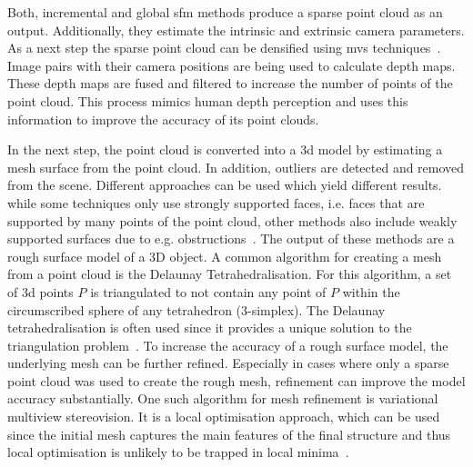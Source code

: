Both, incremental and global \gls{sfm} methods produce a sparse point cloud as an output. Additionally, they estimate the intrinsic and extrinsic camera parameters. As a next step the sparse point cloud can be densified using \gls{mvs} techniques~\cite{Pagani2011DenseImages}. Image pairs with their camera positions are being used to calculate depth maps. These depth maps are fused and filtered to increase the number of points of the point cloud. This process mimics human depth perception and uses this information to improve the accuracy of its point clouds.

In the next step, the point cloud is converted into a \gls{3d} model by estimating a mesh surface from the point cloud. In addition, outliers are detected and removed from the scene. Different approaches can be used which yield different results. while some techniques only use strongly supported faces, i.e. faces that are supported by many points of the point cloud, other methods also include weakly supported surfaces due to e.g. obstructions~\cite{Jancosek2014ExploitingSurfaces}. The output of these methods are a rough surface model of a 3D object.
A common algorithm for creating a mesh from a point cloud is the Delaunay Tetrahedralisation. For this algorithm, a set of \gls{3d} points $P$ is triangulated to not contain any point of $P$ within the circumscribed sphere of any tetrahedron (3-simplex). The Delaunay tetrahedralisation is often used since it provides a unique solution to the triangulation problem~\cite{vu2012high}.
To increase the accuracy of a rough surface model, the underlying mesh can be further refined. Especially in cases where only a sparse point cloud was used to create the rough mesh, refinement can improve the model accuracy substantially. One such algorithm for mesh refinement is variational multiview stereovision. It is a local optimisation approach, which can be used since the initial mesh captures the main features of the final structure and thus local optimisation is unlikely to be trapped in local minima~\cite{Faugeras1998VariationalProblem, vu2012high}.

